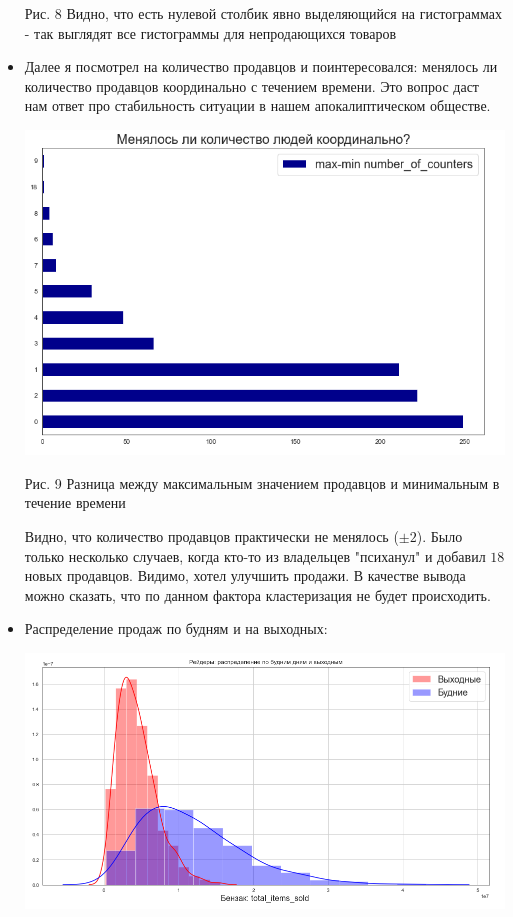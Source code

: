 \documentclass[%
10pt, %
final, %
oneside, %
onecolumn, %
centertags]{article} %
\theoremstyle{plain}
\theoremstyle{definition}
\theoremstyle{remark}
\begin{document}
\begin{itemize}
\begin{center}
 	Рис. 8 Видно, что есть нулевой столбик явно выделяющийся на гистограммах - так выглядят все гистограммы для непродающихся товаров
	\end{center}
	\item Далее я посмотрел на количество продавцов и поинтересовался: менялось ли количество продавцов координально с течением времени. Это вопрос даст нам ответ про стабильность ситуации в нашем апокалиптическом обществе. 
	\begin{center}
	\includegraphics[scale=0.35]{9.png}

 	Рис. 9 Разница между максимальным значением продавцов и минимальным в течение времени
	\end{center}

	Видно, что количество продавцов практически не менялось ($\pm 2$). Было только несколько случаев, когда кто-то из владельцев "психанул" и добавил $18$ новых продавцов. Видимо, хотел улучшить продажи. В качестве вывода можно сказать, что по данном фактора кластеризация не будет происходить.
	\item Распределение продаж по будням и на выходных:
	\begin{center}
	\includegraphics[scale=0.35]{10.png}


\end{center}
\end{itemize}
\end{document}
